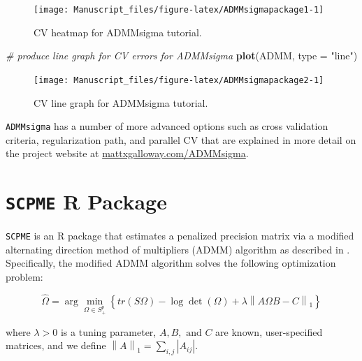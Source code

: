 \documentclass[11pt,]{report}
\newenvironment{Shaded}{\begin{snugshade}}{\end{snugshade}}
\newcommand{\CommentTok}[1]{\textcolor[rgb]{0.56,0.35,0.01}{\textit{#1}}}
\newcommand{\DataTypeTok}[1]{\textcolor[rgb]{0.13,0.29,0.53}{#1}}
\newcommand{\KeywordTok}[1]{\textcolor[rgb]{0.13,0.29,0.53}{\textbf{#1}}}
\newcommand{\NormalTok}[1]{#1}
\newcommand{\StringTok}[1]{\textcolor[rgb]{0.31,0.60,0.02}{#1}}
\begin{document}
\begin{figure}

{\centering \texttt{[image: Manuscript\_files/figure-latex/ADMMsigmapackage1-1]} 

}

\caption{CV heatmap for ADMMsigma tutorial.}\label{fig:ADMMsigmapackage1}
\end{figure}

\begin{Shaded}
\begin{Highlighting}[]
\CommentTok{# produce line graph for CV errors for ADMMsigma}
\KeywordTok{plot}\NormalTok{(ADMM, }\DataTypeTok{type =} \StringTok{"line"}\NormalTok{)}
\end{Highlighting}
\end{Shaded}

\begin{figure}

{\centering \texttt{[image: Manuscript\_files/figure-latex/ADMMsigmapackage2-1]} 

}

\caption{CV line graph for ADMMsigma tutorial.}\label{fig:ADMMsigmapackage2}
\end{figure}

\vspace{0.5cm}

\texttt{ADMMsigma} has a number of more advanced options such as cross validation criteria, regularization path, and parallel CV that are explained in more detail on the project website at \href{http://mattxgalloway.com/ADMMsigma/}{mattxgalloway.com/ADMMsigma}.

\hypertarget{scpme-r-package}{%
\chapter{\texorpdfstring{\texttt{SCPME} R Package}{SCPME R Package}}\label{scpme-r-package}}

\texttt{SCPME} is an R package that estimates a penalized precision matrix via a modified alternating direction method of multipliers (ADMM) algorithm as described in \citet{molstad2017shrinking}. Specifically, the modified ADMM algorithm solves the following optimization problem:

\[ \hat{\Omega} = \arg\min_{\Omega \in S_{+}^{p}}\left\{ tr\left(S \Omega\right) - \log\det\left(\Omega\right) + \lambda\left\| A\Omega B - C \right\|_{1} \right\} \]

where \(\lambda > 0\) is a tuning parameter, \(A, B, \mbox{ and } C\) are known, user-specified matrices, and we define \(\left\|A \right\|_{1} = \sum_{i, j} \left| A_{ij} \right|\).
\end{document}
